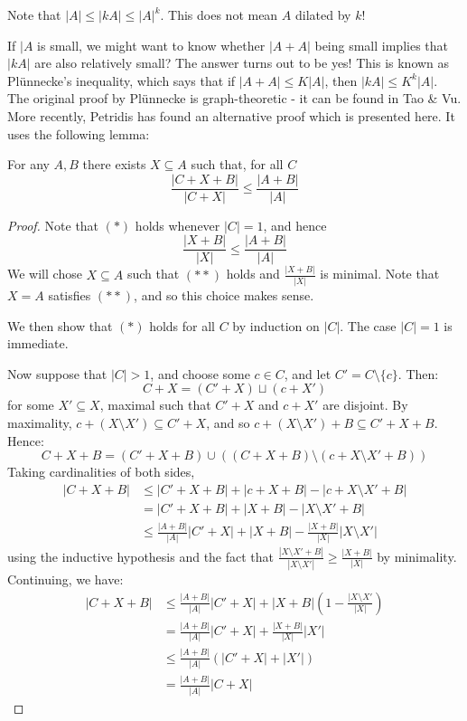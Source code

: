 \documentclass[10pt,a4paper]{article}
\begin{document}
Note that $|A| \leq |kA| \leq |A|^k$. This does not mean $A$ dilated by $k$!

If $|A$ is small, we might want to know whether $|A+A|$ being small implies that $|kA|$ are also relatively small? The answer turns out to be yes! This is known as Pl\"unnecke's inequality, which says that if $|A+A|\leq K|A|$, then $|kA|\leq K^k|A|$. The original proof by Pl\"unnecke is graph-theoretic - it can be found in Tao \& Vu. More recently, Petridis has found an alternative proof which is presented here. It uses the following lemma:
\begin{lemma}
  For any $A, B$ there exists $X \subseteq A$ such that, for all $C$
  \[\frac{|C+X+B|}{|C+X|} \leq \frac{|A+B|}{|A|} \tag{$\ast$}\]
\end{lemma}
\begin{proof}
  Note that $(\ast)$ holds whenever $|C|=1$, and hence
  \[\frac{|X+B|}{|X|}\leq \frac{|A+B|}{|A|}\tag{$\ast \ast$}\]
  We will chose $X \subseteq A$ such that $(\ast\ast)$ holds and $\frac{|X+B|}{|X|}$ is minimal. Note that $X = A$ satisfies $(\ast\ast)$, and so this choice makes sense.

  We then show that $(\ast)$ holds for all $C$ by induction on $|C|$. The case $|C|=1$ is immediate.

  Now suppose that $|C|> 1$, and choose some $c \in C$, and let $C' = C\setminus\{c\}$. Then:
  \[C+X = (C'+X)\sqcup (c+X')\]
  for some $X' \subseteq X$, maximal such that $C'+X$ and $c+X'$ are disjoint. By maximality, $c+(X\setminus X')\subseteq C'+X$, and so $c + (X\setminus X') + B\subseteq C'+X+B$. Hence:
  \[C+X+B = (C'+X+B)\cup((C+X+B)\setminus(c+X\setminus X' +B))\]
  Taking cardinalities of both sides,
  \begin{align*}
    |C+X+B| &\leq |C'+X+B|+|c+X+B| - |c+X\setminus X' +B|\\
    &= |C'+X+B| + |X+B| - |X\setminus X' + B|\\
    &\leq \frac{|A+B|}{|A|}|C'+X| + |X+B| - \frac{|X+B|}{|X|}|X\setminus X'|
  \end{align*}
  using the inductive hypothesis and the fact that $\frac{|X\setminus X'+B|}{|X\setminus X'|} \geq \frac{|X+B|}{|X|}$ by minimality. Continuing, we have:
  \begin{align*}
    |C+X+B| &\leq \frac{|A+B|}{|A|}|C'+X| + |X+B|\left(1-\frac{|X\setminus X'}{|X|}\right)\\
    &= \frac{|A+B|}{|A|}|C'+X| + \frac{|X+B|}{|X|}|X'|\\
    &\leq \frac{|A+B|}{|A|}(|C'+X|+|X'|)\\
    &= \frac{|A+B|}{|A|}|C+X|
  \end{align*}
\end{proof}
\end{document}
